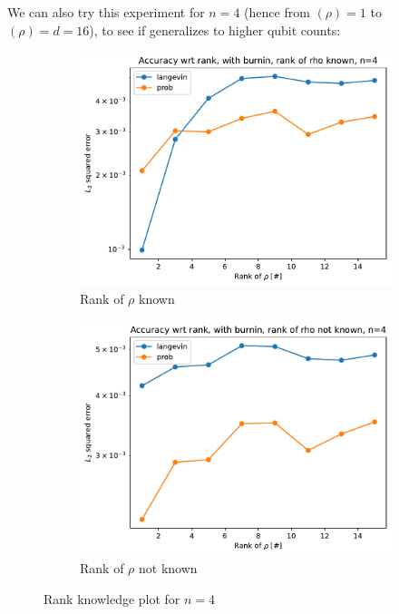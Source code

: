 \documentclass[12pt]{memoir}
\newcommand{\rhorankn}[1]{\text{rank}$(\rho)=#1$}
\begin{document}
We can also try this experiment for $n=4$ (hence from \rhorankn{1} to \rhorankn{d=16}), to see if generalizes to higher qubit counts:
\begin{figure}[H]
    \centering
    \begin{subfigure}[b]{0.49\textwidth}
        \centering
        \includegraphics[width=\textwidth]{figures/experiments/rank_info/rank_known_n4-1.png}
        \caption{Rank of $\rho$ known}
        \label{fig:rank-info-n4-sub}
    \end{subfigure}
    \hfill
    \begin{subfigure}[b]{0.49\textwidth}
        \centering
        \includegraphics[width=\textwidth]{figures/experiments/rank_info/rank_not_known_n4-1.png}
        \caption{Rank of $\rho$ not known}
        \label{fig:rank-no-info-n4-sub}
    \end{subfigure}
    \caption{Rank knowledge plot for $n=4$}
    \label{fig:rank-info-n4}
\end{figure}
\end{document}
